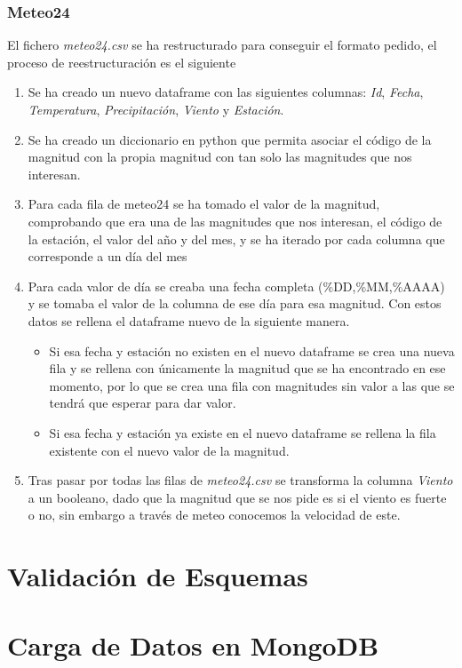 \documentclass[]{article}
\begin{document}
\subsubsection{Meteo24}
\label{subsubsec:preprocessmeteo}
El fichero \textit{meteo24.csv} se ha restructurado para conseguir el formato pedido, el proceso de reestructuración es el siguiente

\begin{enumerate}
    \item Se ha creado un nuevo dataframe con las siguientes columnas: \textit{Id}, \textit{Fecha}, \textit{Temperatura}, \textit{Precipitación}, \textit{Viento} y \textit{Estación}.
    \item Se ha creado un diccionario en python que permita asociar el código de la magnitud con la propia magnitud con tan solo las magnitudes que nos interesan.
    \item Para cada fila de meteo24 se ha tomado el valor de la magnitud, comprobando que era una de las magnitudes que nos interesan, el código de la estación, el valor del año y del mes, y se ha iterado por cada columna que corresponde a un día del mes
    \item Para cada valor de día se creaba una fecha completa (\%DD,\%MM,\%AAAA) y se tomaba el valor de la columna de ese día para esa magnitud. Con estos datos se rellena el dataframe nuevo de la siguiente manera.
    \begin{itemize}
        \item Si esa fecha y estación no existen en el nuevo dataframe se crea una nueva fila y se rellena con únicamente la magnitud que se ha encontrado en ese momento, por lo que se crea una fila con magnitudes sin valor a las que se tendrá que esperar para dar valor.
        \item Si esa fecha y estación ya existe en el nuevo dataframe se rellena la fila existente con el nuevo valor de la magnitud.
    \end{itemize}
    \item Tras pasar por todas las filas de \textit{meteo24.csv} se transforma la columna \textit{Viento} a un booleano, dado que la magnitud que se nos pide es si el viento es fuerte o no, sin embargo a través de meteo conocemos la velocidad de este.
\end{enumerate}

\newpage
\section{Validación de Esquemas}
\label{sec:validacion}

\newpage
\section{Carga de Datos en MongoDB}
\label{sec:mondongo}
\end{document}
